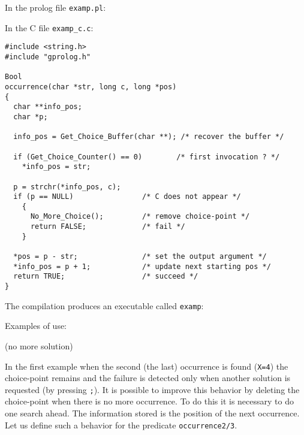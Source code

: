 In the prolog file \texttt{examp.pl}:


In the C file \texttt{examp\_c.c}:

\begin{Indentation}
\begin{verbatim}
#include <string.h>
#include "gprolog.h"

Bool
occurrence(char *str, long c, long *pos)
{
  char **info_pos;
  char *p;

  info_pos = Get_Choice_Buffer(char **); /* recover the buffer */

  if (Get_Choice_Counter() == 0)        /* first invocation ? */
    *info_pos = str;

  p = strchr(*info_pos, c);
  if (p == NULL)                /* C does not appear */
    {
      No_More_Choice();         /* remove choice-point */
      return FALSE;             /* fail */
    }

  *pos = p - str;               /* set the output argument */
  *info_pos = p + 1;            /* update next starting pos */
  return TRUE;                  /* succeed */
}
\end{verbatim}
\end{Indentation}

The compilation produces an executable called \texttt{examp}:


Examples of use:

\begin{CodeTwoCols}
\SkipLine
{}
\SkipLine
{}
\SkipLine
{}     {(no more solution)}
\SkipLine
{}
\SkipLine
{}
\end{CodeTwoCols}

In the first example when the second (the last) occurrence is found
(\texttt{X=4}) the choice-point remains and the failure is detected only when
another solution is requested (by pressing \texttt{;}). It is possible to
improve this behavior by deleting the choice-point when there is no more
occurrence. To do this it is necessary to do one search ahead. The
information stored is the position of the next occurrence. Let us define such
a behavior for the predicate \texttt{occurrence2/3}.

